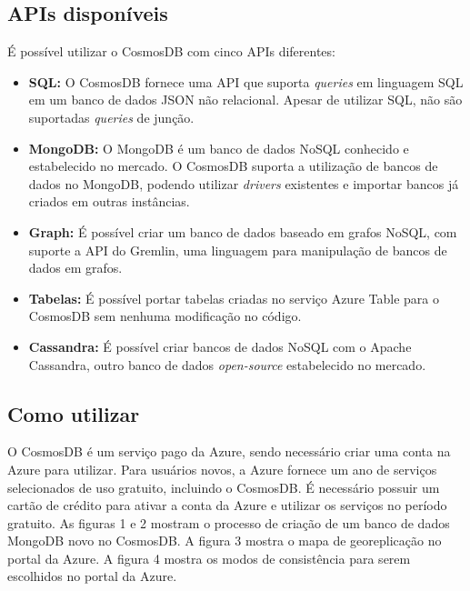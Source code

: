 \documentclass[12pt]{article}
\begin{document}
\subsection{APIs disponíveis}
É possível utilizar o CosmosDB com cinco APIs diferentes:
\begin{itemize}
	\item \textbf{SQL:} O CosmosDB fornece uma API que suporta \textit{queries} em linguagem SQL em um banco de dados JSON não relacional. Apesar de utilizar SQL, não são suportadas \textit{queries} de junção.
	\item \textbf{MongoDB:} O MongoDB é um banco de dados NoSQL conhecido e estabelecido no mercado. O CosmosDB suporta a utilização de bancos de dados no MongoDB, podendo utilizar \textit{drivers} existentes e importar bancos já criados
	em outras instâncias.
	\item \textbf{Graph:} É possível criar um banco de dados baseado em grafos NoSQL, com suporte a API do Gremlin, uma linguagem para manipulação de bancos de dados em grafos.
	\item \textbf{Tabelas:} É possível portar tabelas criadas no serviço Azure Table para o CosmosDB sem nenhuma modificação no código.
	\item \textbf{Cassandra:} É possível criar bancos de dados NoSQL com o Apache Cassandra, outro banco de dados \textit{open-source} estabelecido no mercado.
\end{itemize}

\subsection{Como utilizar}
O CosmosDB é um serviço pago da Azure, sendo necessário criar uma conta na Azure para utilizar. Para usuários novos, a Azure fornece um ano de serviços selecionados de uso gratuito, incluindo o CosmosDB. É necessário possuir um cartão de crédito
para ativar a conta da Azure e utilizar os serviços no período gratuito. As figuras 1 e 2 mostram o processo de criação de um banco de dados MongoDB novo no CosmosDB. A figura 3 mostra o mapa de 
georeplicação no portal da Azure. A figura 4 mostra os modos de consistência para serem escolhidos no portal da Azure.
\end{document}
